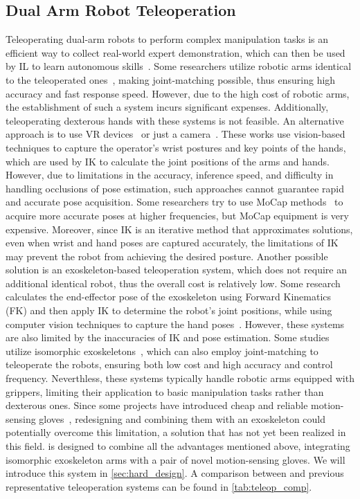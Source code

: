 \subsection{Dual Arm Robot Teleoperation}
Teleoperating dual-arm robots to perform complex manipulation tasks is an efficient way to collect real-world expert demonstration, which can then be used by IL to learn autonomous skills~\cite{fu2024mobile,cheng2024open,ze2024humanoid_manipulation,black2024pi_0,lin2024learning}. Some researchers utilize robotic arms identical to the teleoperated ones~\cite{zhao2023learning,fu2024mobile,wu2023gello,fang2024airexo}, making joint-matching possible, thus ensuring high accuracy and fast response speed. However, due to the high cost of robotic arms, the establishment of such a system incurs significant expenses. Additionally, teleoperating dexterous hands with these systems is not feasible. An alternative approach is to use VR devices~\cite{cheng2024open,iyer2024open} or just a camera~\cite{Sivakumar-RSS-22,qin2023anyteleop,li2024okami}. These works use vision-based techniques to capture the operator's wrist postures and key points of the hands, which are used by IK to calculate the joint positions of the arms and hands. However, due to limitations in the accuracy, inference speed, and difficulty in handling occlusions of pose estimation, such approaches cannot guarantee rapid and accurate pose acquisition. Some researchers try to use MoCap methods~\cite{wang2024dexcap,caeiro2021systematic,liu2019high,liu2017glove} to acquire more accurate poses at higher frequencies, but MoCap equipment is very expensive. Moreover, since IK is an iterative method that approximates solutions, even when wrist and hand poses are captured accurately, the limitations of IK may prevent the robot from achieving the desired posture.  Another possible solution is an exoskeleton-based teleoperation system, which does not require an additional identical robot, thus the overall cost is relatively low. Some research calculates the end-effector pose of the exoskeleton using Forward Kinematics (FK) and then apply IK to determine the robot's joint positions, while using computer vision techniques to capture the hand poses~\cite{yang2024ace}. However, these systems are also limited by the inaccuracies of IK and pose estimation. Some studies utilize isomorphic exoskeletons~\cite{wu2023gello,fang2024airexo}, which can also employ joint-matching to teleoperate the robots, ensuring both low cost and high accuracy and control frequency. Neverthless, these systems typically handle robotic arms equipped with grippers, limiting their application to basic manipulation tasks rather than dexterous ones. Since some projects have introduced cheap and reliable motion-sensing gloves~\cite{Nepyope2023Project-Homunculus,dafarra2024icub3}, redesigning and combining them with an exoskeleton could potentially overcome this limitation, a solution that has not yet been realized in this field. \ourshort is designed to combine all the advantages mentioned above, integrating isomorphic exoskeleton arms with a pair of novel motion-sensing gloves. We will introduce this system in \cref{sec:hard_design}. A comparison between \ourshort and previous representative teleoperation systems can be found in \cref{tab:teleop_comp}.


